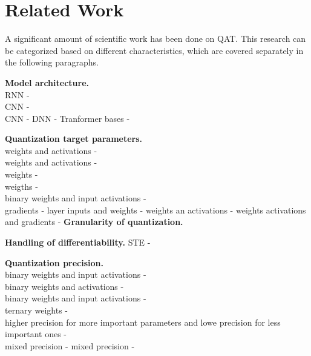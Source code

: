 \chapter{Related Work\label{cha:chapter5}}

A significant amount of scientific work has been done on QAT. 
This research can be categorized based on different characteristics, 
which are covered separately in the following paragraphs.

\noindent
\textbf{Model architecture.}\\
RNN - \cite{ott2016rnn}\\
CNN - \cite{rastegari2016xnor}\\
CNN - \cite{courbariaux2015binaryconnect}
DNN - \cite{yunchao2014compressing}
Tranformer bases - \cite{kim2021ibert}

\noindent
\textbf{Quantization target parameters.}\\
weights and activations - \cite{krishnamoorthi2018quantizing}\\
weights and activations - \cite{hubara2016qnn}\\
weights - \cite{polino2018modelcompression}\\
weigths - \cite{ott2016rnn}\\
binary weights and input activations - \cite{rastegari2016xnor}\\
gradients - \cite{shuchang2016dorafenet}
layer inputs and weights - \cite{Edouard2022SPIQ} 
weights an activations -  \cite{DBLP:conf/eccv/ZhangYYH18}
weights activations and gradients - \cite{shuchang2016dorafenet}
\noindent
\textbf{Granularity of quantization.}

\noindent
\textbf{Handling of differentiability.}
STE -  \cite{DBLP:conf/eccv/ZhangYYH18}

\noindent
\textbf{Quantization precision.}\\
binary weights and input activations - \cite{courbariaux2015binaryconnect}\\
binary weights and activations - \cite{hubara2016qnn}\\
binary weights and input activations - \cite{rastegari2016xnor}\\
ternary weights - \cite{ott2016rnn}\\
higher precision for more important parameters and lowe precision for less important ones - \cite{soroosh2018adaptive}\\
mixed precision - \cite{DBLP:conf/eccv/WangLGAC22}
mixed precision - \cite{DBLP:journals/ijcv/DongNLCSZ19}

